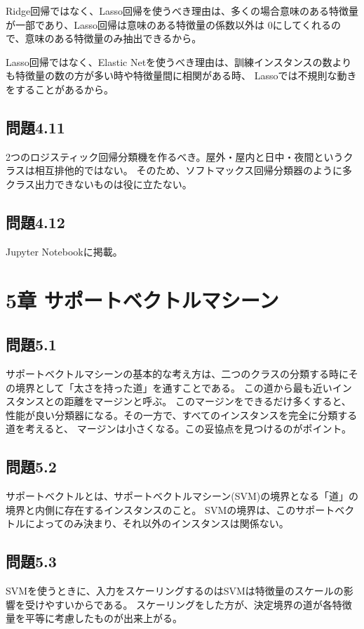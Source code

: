 \documentclass[a4j,twocolumn]{jsarticle}
\begin{document}
Ridge回帰ではなく、Lasso回帰を使うべき理由は、多くの場合意味のある特徴量が一部であり、Lasso回帰は意味のある特徴量の係数以外は
0にしてくれるので、意味のある特徴量のみ抽出できるから。

Lasso回帰ではなく、Elastic Netを使うべき理由は、訓練インスタンスの数よりも特徴量の数の方が多い時や特徴量間に相関がある時、
Lassoでは不規則な動きをすることがあるから。

\subsection{問題4.11}
2つのロジスティック回帰分類機を作るべき。屋外・屋内と日中・夜間というクラスは相互排他的ではない。
そのため、ソフトマックス回帰分類器のように多クラス出力できないものは役に立たない。

\subsection{問題4.12}
Jupyter Notebookに掲載。

\section{5章 サポートベクトルマシーン}
\subsection{問題5.1}
サポートベクトルマシーンの基本的な考え方は、二つのクラスの分類する時にその境界として「太さを持った道」を通すことである。
この道から最も近いインスタンスとの距離をマージンと呼ぶ。
このマージンをできるだけ多くすると、性能が良い分類器になる。その一方で、すべてのインスタンスを完全に分類する道を考えると、
マージンは小さくなる。この妥協点を見つけるのがポイント。

\subsection{問題5.2}
サポートベクトルとは、サポートベクトルマシーン(SVM)の境界となる「道」の境界と内側に存在するインスタンスのこと。
SVMの境界は、このサポートベクトルによってのみ決まり、それ以外のインスタンスは関係ない。

\subsection{問題5.3}
SVMを使うときに、入力をスケーリングするのはSVMは特徴量のスケールの影響を受けやすいからである。
スケーリングをした方が、決定境界の道が各特徴量を平等に考慮したものが出来上がる。
\end{document}
